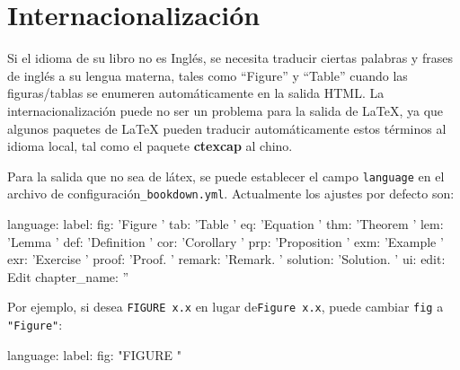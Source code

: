 \documentclass[12pt,]{krantz}
\makeatletter
\newenvironment{Shaded}{\begin{snugshade}}{\end{snugshade}}
\newcommand{\StringTok}[1]{\textcolor[rgb]{0.31,0.60,0.02}{#1}}
\newcommand{\FunctionTok}[1]{\textcolor[rgb]{0.00,0.00,0.00}{#1}}
\newcommand{\AttributeTok}[1]{\textcolor[rgb]{0.77,0.63,0.00}{#1}}
\newenvironment{kframe}{%
\medskip{}
\setlength{\fboxsep}{.8em}
 \def\at@end@of@kframe{}%
 \ifinner\ifhmode%
  \def\at@end@of@kframe{\end{minipage}}%
  \begin{minipage}{\columnwidth}%
 \fi\fi%
 \def\FrameCommand##1{\hskip\@totalleftmargin \hskip-\fboxsep
 \colorbox{shadecolor}{##1}\hskip-\fboxsep
     \hskip-\linewidth \hskip-\@totalleftmargin \hskip\columnwidth}%
 \MakeFramed {\advance\hsize-\width
   \@totalleftmargin\z@ \linewidth\hsize
   \@setminipage}}%
 {\par\unskip\endMakeFramed%
 \at@end@of@kframe}
\renewenvironment{Shaded}{\begin{kframe}}{\end{kframe}}
\theoremstyle{definition}
\theoremstyle{definition}
\theoremstyle{definition}
\theoremstyle{remark}
\makeatother
\begin{document}
\hypertarget{internacionalizacion}{\section{Internacionalización}\label{internacionalizacion}}

Si el idioma de su libro no es Inglés, se necesita traducir ciertas
palabras y frases de inglés a su lengua materna, tales como ``Figure'' y
``Table'' cuando las figuras/tablas se enumeren automáticamente en la
salida HTML. La internacionalización puede no ser un problema para la
salida de LaTeX, ya que algunos paquetes de LaTeX pueden traducir
automáticamente estos términos al idioma local, tal como el paquete
\textbf{ctexcap} al chino.

Para la salida que no sea de látex, se puede establecer el campo
\texttt{language} en el archivo de configuración\texttt{\_bookdown.yml}.
Actualmente los ajustes por defecto son:

\begin{Shaded}
\begin{Highlighting}[]
\FunctionTok{language:}
  \FunctionTok{label:}
    \FunctionTok{fig:}\AttributeTok{ }\StringTok{'Figure '}
    \FunctionTok{tab:}\AttributeTok{ }\StringTok{'Table '}
    \FunctionTok{eq:}\AttributeTok{ }\StringTok{'Equation '}
    \FunctionTok{thm:}\AttributeTok{ }\StringTok{'Theorem '}
    \FunctionTok{lem:}\AttributeTok{ }\StringTok{'Lemma '}
    \FunctionTok{def:}\AttributeTok{ }\StringTok{'Definition '}
    \FunctionTok{cor:}\AttributeTok{ }\StringTok{'Corollary '}
    \FunctionTok{prp:}\AttributeTok{ }\StringTok{'Proposition '}
    \FunctionTok{exm:}\AttributeTok{ }\StringTok{'Example '}
    \FunctionTok{exr:}\AttributeTok{ }\StringTok{'Exercise '}
    \FunctionTok{proof:}\AttributeTok{ }\StringTok{'Proof. '}
    \FunctionTok{remark:}\AttributeTok{ }\StringTok{'Remark. '}
    \FunctionTok{solution:}\AttributeTok{ }\StringTok{'Solution. '}
  \FunctionTok{ui:}
    \FunctionTok{edit:}\AttributeTok{ Edit}
    \FunctionTok{chapter_name:}\AttributeTok{ }\StringTok{''}
\end{Highlighting}
\end{Shaded}

Por ejemplo, si desea \texttt{FIGURE\ x.x} en lugar
de\texttt{Figure\ x.x}, puede cambiar \texttt{fig} a \texttt{"Figure"}:

\begin{Shaded}
\begin{Highlighting}[]
\FunctionTok{language:}
  \FunctionTok{label:}
    \FunctionTok{fig:}\AttributeTok{ }\StringTok{"FIGURE "}
\end{Highlighting}
\end{Shaded}
\end{document}
